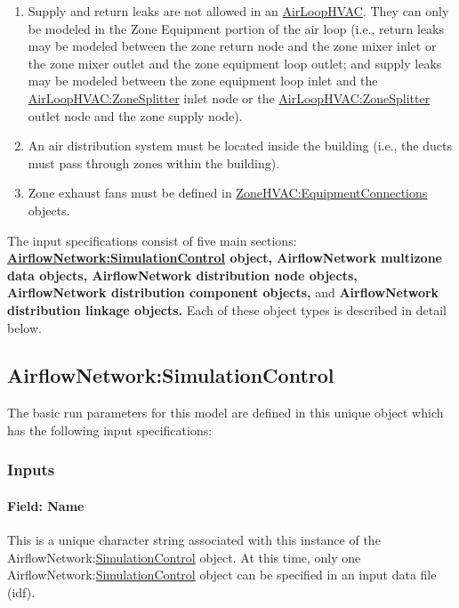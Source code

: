 \begin{enumerate}
\item Supply and return leaks are not allowed in an \hyperref[airloophvac]{AirLoopHVAC}. They can only be modeled in the Zone Equipment portion of the air loop (i.e., return leaks may be modeled between the zone return node and the zone mixer inlet or the zone mixer outlet and the zone equipment loop outlet; and supply leaks may be modeled between the zone equipment loop inlet and the \hyperref[airloophvaczonesplitter]{AirLoopHVAC:ZoneSplitter} inlet node or the \hyperref[airloophvaczonesplitter]{AirLoopHVAC:ZoneSplitter} outlet node and the zone supply node).
\item An air distribution system must be located inside the building (i.e., the ducts must pass through zones within the building).
\item Zone exhaust fans must be defined in \hyperref[zonehvacequipmentconnections]{ZoneHVAC:EquipmentConnections} objects.
\end{enumerate}

The input specifications consist of five main sections: \textbf{\hyperref[airflownetworksimulationcontrol]{AirflowNetwork:\hyperref[simulationcontrol]{SimulationControl}} object, AirflowNetwork multizone data objects, AirflowNetwork distribution node objects, AirflowNetwork distribution component objects,} and \textbf{AirflowNetwork distribution linkage objects.} Each of these object types is described in detail below.

\subsection{AirflowNetwork:SimulationControl}\label{airflownetworksimulationcontrol}

The basic run parameters for this model are defined in this unique object which has the following input specifications:

\subsubsection{Inputs}\label{inputs-004}

\paragraph{Field: Name}\label{field-name-004}

This is a unique character string associated with this instance of the AirflowNetwork:\hyperref[simulationcontrol]{SimulationControl} object. At this time, only one AirflowNetwork:\hyperref[simulationcontrol]{SimulationControl} object can be specified in an input data file (idf).

